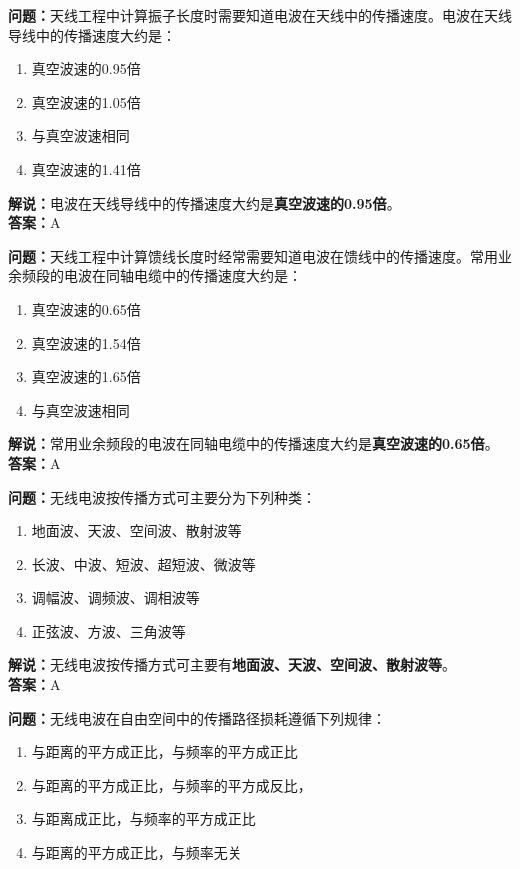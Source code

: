 \textbf{问题：}天线工程中计算振子长度时需要知道电波在天线中的传播速度。电波在天线导线中的传播速度大约是：

\begin{enumerate}[label=\Alph*), leftmargin=1cm]
	\item 真空波速的0.95倍
	\item 真空波速的1.05倍
	\item 与真空波速相同
	\item 真空波速的1.41倍
\end{enumerate}

\textbf{解说：}电波在天线导线中的传播速度大约是\textbf{真空波速的0.95倍}。\\\textbf{答案：}A%



\textbf{问题：}天线工程中计算馈线长度时经常需要知道电波在馈线中的传播速度。常用业余频段的电波在同轴电缆中的传播速度大约是：

\begin{enumerate}[label=\Alph*), leftmargin=1cm]
	\item 真空波速的0.65倍
	\item 真空波速的1.54倍
	\item 真空波速的1.65倍
	\item 与真空波速相同
\end{enumerate}

\textbf{解说：}常用业余频段的电波在同轴电缆中的传播速度大约是\textbf{真空波速的0.65倍}。\\\textbf{答案：}A%



\textbf{问题：}无线电波按传播方式可主要分为下列种类：

\begin{enumerate}[label=\Alph*), leftmargin=1cm]
	\item 地面波、天波、空间波、散射波等
	\item 长波、中波、短波、超短波、微波等
	\item 调幅波、调频波、调相波等
	\item 正弦波、方波、三角波等
\end{enumerate}

\textbf{解说：}无线电波按传播方式可主要有\textbf{地面波、天波、空间波、散射波等}。\\\textbf{答案：}A%



\textbf{问题：}无线电波在自由空间中的传播路径损耗遵循下列规律：

\begin{enumerate}[label=\Alph*), leftmargin=1cm]
	\item 与距离的平方成正比，与频率的平方成正比
	\item 与距离的平方成正比，与频率的平方成反比，
	\item 与距离成正比，与频率的平方成正比
	\item 与距离的平方成正比，与频率无关
\end{enumerate}

